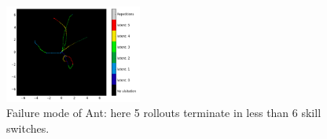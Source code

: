 \documentclass{article} %
\begin{document}
\begin{figure}[h]
    \centering
    \includegraphics[width = 0.4\textwidth]{Figures/ant-failure.png}
    \caption{Failure mode of Ant: here 5 rollouts terminate in less than 6 skill switches.}
    \label{fig:ant-failure}
\end{figure}


\end{document}
